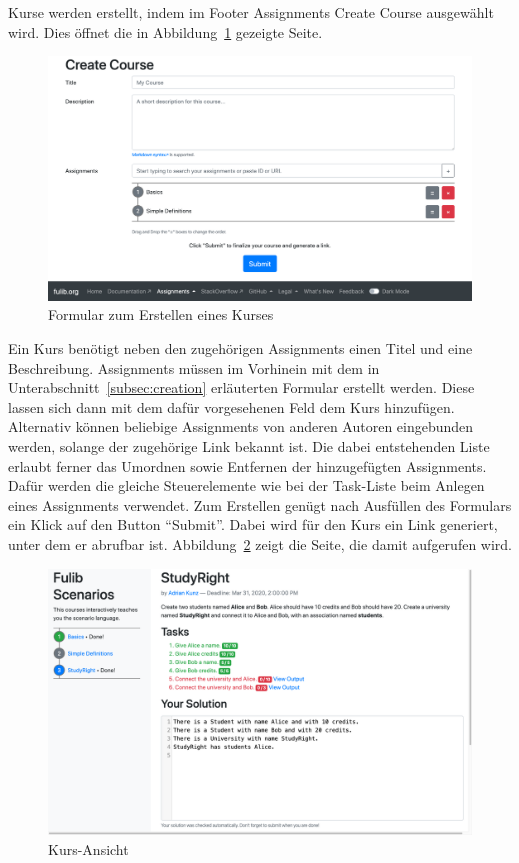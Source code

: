 Kurse werden erstellt, indem im Footer Assignments \textrightarrow Create Course ausgewählt wird.
Dies öffnet die in Abbildung~\ref{fig:create-course} gezeigte Seite.

\begin{figure}
    \centering
    \includegraphics[width=\textwidth]{chapter/fulib.org/img/create-course.png}
    \caption{Formular zum Erstellen eines Kurses}
    \label{fig:create-course}
\end{figure}

Ein Kurs benötigt neben den zugehörigen Assignments einen Titel und eine Beschreibung.
Assignments müssen im Vorhinein mit dem in Unterabschnitt~\ref{subsec:creation} erläuterten Formular erstellt werden.
Diese lassen sich dann mit dem dafür vorgesehenen Feld dem Kurs hinzufügen.
Alternativ können beliebige Assignments von anderen Autoren eingebunden werden,
solange der zugehörige Link bekannt ist.
Die dabei entstehenden Liste erlaubt ferner das Umordnen sowie Entfernen der hinzugefügten Assignments.
Dafür werden die gleiche Steuerelemente wie bei der Task-Liste beim Anlegen eines Assignments verwendet.
Zum Erstellen genügt nach Ausfüllen des Formulars ein Klick auf den Button ``Submit''.
Dabei wird für den Kurs ein Link generiert, unter dem er abrufbar ist.
Abbildung~\ref{fig:course-view} zeigt die Seite, die damit aufgerufen wird.

\begin{figure}
    \centering
    \includegraphics[width=\textwidth]{chapter/fulib.org/img/course-view.png}
    \caption{Kurs-Ansicht}
    \label{fig:course-view}
\end{figure}

